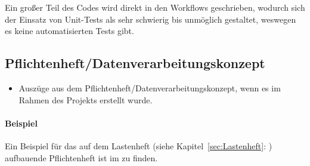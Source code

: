 Ein großer Teil des Codes wird direkt in den Workflows geschrieben, wodurch sich der Einsatz von Unit-Tests als sehr schwierig bis unmöglich gestaltet, weswegen es keine automatisierten Tests gibt.

\subsection{Pflichtenheft/Datenverarbeitungskonzept}
\label{sec:Pflichtenheft}
\begin{itemize}
	\item Auszüge aus dem Pflichtenheft/Datenverarbeitungskonzept, wenn es im Rahmen des Projekts erstellt wurde.
\end{itemize}

\paragraph{Beispiel}
Ein Beispiel für das auf dem Lastenheft (siehe Kapitel~\ref{sec:Lastenheft}: ) aufbauende Pflichtenheft ist im  zu finden.
